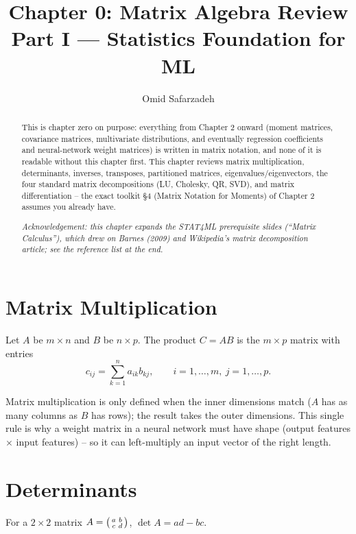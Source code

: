 \documentclass[11pt]{article}
\title{Chapter 0: Matrix Algebra Review \\ \large Part I --- Statistics Foundation for ML}
\author{Omid Safarzadeh}
\date{}
\begin{document}
\maketitle

\begin{abstract}
\noindent
This is chapter zero on purpose: everything from Chapter 2 onward (moment
matrices, covariance matrices, multivariate distributions, and eventually
regression coefficients and neural-network weight matrices) is written in
matrix notation, and none of it is readable without this chapter first.
This chapter reviews matrix multiplication, determinants, inverses,
transposes, partitioned matrices, eigenvalues/eigenvectors, the four
standard matrix decompositions (LU, Cholesky, QR, SVD), and matrix
differentiation -- the exact toolkit \S4 (Matrix Notation for Moments) of
Chapter 2 assumes you already have.

\emph{Acknowledgement: this chapter expands the STAT4ML prerequisite
slides (``Matrix Calculus''), which drew on Barnes (2009) and Wikipedia's
matrix decomposition article; see the reference list at the end.}
\end{abstract}

\tableofcontents

\section{Matrix Multiplication}

\begin{definition}
Let $A$ be $m \times n$ and $B$ be $n \times p$. The product $C = AB$ is
the $m \times p$ matrix with entries
\[
  c_{ij} = \sum_{k=1}^n a_{ik} b_{kj}, \qquad i = 1,\dots,m,\ j = 1,\dots,p.
\]
\end{definition}

Matrix multiplication is only defined when the inner dimensions match ($A$
has as many columns as $B$ has rows); the result takes the outer
dimensions. This single rule is why a weight matrix in a neural network
must have shape (output features $\times$ input features) -- so it can
left-multiply an input vector of the right length.

\section{Determinants}

For a $2\times 2$ matrix $A = \begin{psmallmatrix} a & b \\ c & d
\end{psmallmatrix}$, $\det A = ad - bc$.
\end{document}
